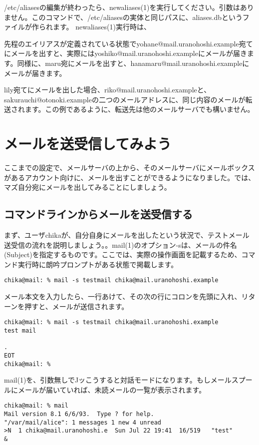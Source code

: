 /etc/aliasesの編集が終わったら、newaliases(1)を実行してください。引数はありません。このコマンドで、/etc/aliasesの実体と同じパスに、aliases.dbというファイルが作られます。
newaliases(1)実行時は、

先程のエイリアスが定義されている状態でyohane@mail.uranohoshi.example宛てにメールを出すと、実際にはyoshiko@mail.uranohoshi.exampleにメールが届きます。同様に、maru宛にメールを出すと、hanamaru@mail.uranohoshi.exampleにメールが届きます。

lily宛てにメールを出した場合、riko@mail.uranohoshi.exampleと、sakurauchi@otonoki.exampleの二つのメールアドレスに、同じ内容のメールが転送されます。この例であるように、転送先は他のメールサーバでも構いません。

\section{メールを送受信してみよう}
ここまでの設定で、メールサーバの上から、そのメールサーバにメールボックスがあるアカウント向けに、メールを出すことができるようになりました。では、マズ自分宛にメールを出してみることにしましょう。

\subsection{コマンドラインからメールを送受信する}

まず、ユーザchikaが、自分自身にメールを出したという状況で、テストメール送受信の流れを説明しましょう。。mail(1)のオプション-sは、メールの件名(Subject)を指定するものです。ここでは、実際の操作画面を記載するため、コマンド実行時に朗吟プロンプトがある状態で掲載します。

\begin{verbatim}
chika@mail: % mail -s testmail chika@mail.uranohoshi.example
\end{verbatim}

メール本文を入力したら、一行あけて、その次の行にコロンを先頭に入れ、リターンを押すと、メールが送信されます。

\begin{verbatim}
chika@mail: % mail -s testmail chika@mail.uranohoshi.example
test mail

.
EOT
chika@mail: % 
\end{verbatim}

mail(1)を、引数無しでJッこうすると対話モードになります。もしメールスプールにメールが届いていれば、未読メールの一覧が表示されます。

\begin{verbatim}
chika@mail: % mail
Mail version 8.1 6/6/93.  Type ? for help.
"/var/mail/alice": 1 messages 1 new 4 unread
>N  1 chika@mail.uranohoshi.e  Sun Jul 22 19:41  16/519   "test"
&
\end{verbatim}

